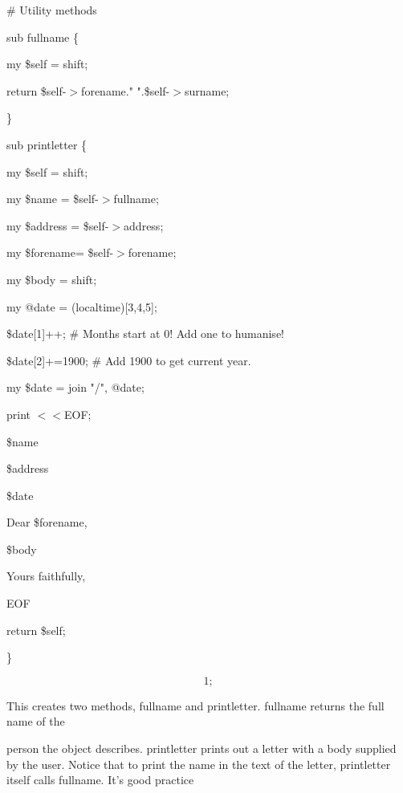 \documentclass[a4paper,11pt]{book}
\begin{document}
\noindent 

\noindent \# Utility methods

\noindent sub fullname \{

\noindent my \$self = shift;

\noindent return \$self-$>$forename." ".\$self-$>$surname;

\noindent \}

\noindent 

\noindent sub printletter \{

\noindent my \$self = shift;

\noindent my \$name = \$self-$>$fullname;

\noindent my \$address = \$self-$>$address;

\noindent my \$forename= \$self-$>$forename;

\noindent my \$body = shift;

\noindent my @date = (localtime)[3,4,5];

\noindent \$date[1]++; \# Months start at 0! Add one to humanise!

\noindent \$date[2]+=1900;  \# Add 1900 to get current year.

\noindent my \$date = join "/", @date;

\noindent 

\noindent print $<$$<$EOF;

\noindent \$name

\noindent \$address

\noindent 

\noindent \$date

\noindent 

\noindent Dear \$forename,

\noindent 

\noindent \$body

\noindent 

\noindent Yours faithfully,

\noindent EOF

\noindent return \$self;

\noindent \}

\noindent 

\[1;\] 


\noindent 

\noindent This creates two methods, fullname and printletter. fullname returns the full name of the

\noindent person the object describes. printletter prints out a letter with a body supplied by the user. Notice that to print the name in the text of the letter, printletter itself calls fullname. It's good practice
\end{document}
